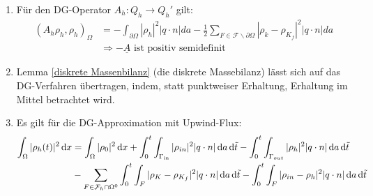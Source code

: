 \begin{remark}
	\begin{enumerate} 
		\item Für den DG-Operator $A_h: Q_h \rightarrow Q_h'$ gilt: 	\newline
		\begin{align*}
			(A_h\rho_h,\rho_h)_{\Omega} &= - \int_{\partial 	\Omega} | \rho_h | ^2 | q \cdot n | da - \frac{1}{2} \sum_{F 	\in \mathcal{F} \backslash \partial \Omega} | \rho_k - 	\rho_{K_f} |^2 |q \cdot n| da \\
			&\Rightarrow - \underline{A} \text{ ist positiv 	semidefinit}
		\end{align*}
		\item Lemma \ref{diskrete Massenbilanz} (die diskrete Massebilanz) lässt sich auf das DG-Verfahren übertragen, indem, statt punktweiser Erhaltung, Erhaltung im Mittel betrachtet wird.
		\item Es gilt für die DG-Approximation mit Upwind-Flux: \newline
		\begin{align*}
			\int_{\Omega} | \rho_h (t) | ^2 \diff x &= \int_{\Omega} |\rho_0 |^2 \diff x 
			+ \int_0^t \int_{\Gammain} | \rho_{in} |^2 |q \cdot n | \diff a \diff \tilde{t}
			- \int_0^t \int_{\Gamma_{out}} |\rho_h |^2 |q \cdot n | \diff a \diff \tilde{t} \\
			&- \sum_{F \in \mathcal{F}_h \cap \Omega^0} \int_0^t \int_F | \rho_K - \rho_{K_f} |^2 |q \cdot n| \diff a \diff \tilde{t}
			- \int_0^t \int_F |\rho_{in} - \rho_h |^2 |q \cdot n| \diff a \diff \tilde{t}
		\end{align*}
	\end{enumerate}
\end{remark}